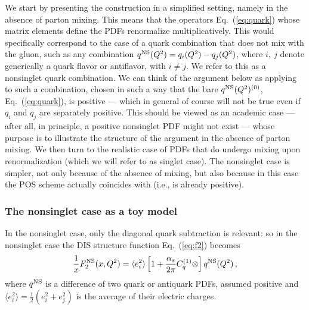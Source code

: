 We start by presenting the construction in a simplified setting, 
namely in the absence of parton mixing. This means that the operators
Eq.~(\ref{eq:quark}) whose matrix elements define the PDFs renormalize
multiplicatively.
This would specifically correspond to
the case of a quark combination that does not mix with the
gluon, such as  any combination $q^{{\textrm{NS}}}(Q^2)=q_i(Q^2)-q_j(Q^2)$,
where $i,\>j$ denote generically a quark flavor or antiflavor, with
$i\not= j$.  We refer to this as a 
nonsinglet quark combination. We can think of the argument below as
applying to such a combination, 
chosen in such a way that  the bare
$q^{{\textrm{NS}}}(Q^2)^{(0)}$, Eq.~(\ref{eq:quark}), is positive --- which in
general of course will not be true even if $q_i$ and $q_j$ are
separately positive. 
This should be viewed as an academic case --- after
all, in principle, a positive nonsinglet PDF might not exist --- whose
purpose is to illustrate the structure of the argument in the absence
of parton mixing. We then turn
to the realistic case of PDFs that do undergo mixing upon
renormalization (which we will refer to as singlet case).
The nonsinglet case is simpler, not only because of the absence of
mixing, but also because in  this case
the POS scheme actually coincides with \msbar{} (i.e., \msbar{} is already
positive). 

\subsubsection{The nonsinglet case as a toy model}
\label{sec:nonsing}

In the nonsinglet case, only the diagonal
quark subtraction is relevant: so in the nonsinglet case
the DIS structure function Eq.~(\ref{eq:f2}) becomes
\begin{equation}\label{eq:disfact}
 \frac{1}{x} F_2^{{\textrm{NS}}}(x,Q^2)= \langle e_i^2\rangle \left[1
 +\frac{\alpha_s}{2\pi}  C^{(1)}_q \otimes \right] q^{{\textrm{NS}}}(Q^2) \,,
\end{equation}
where $q^{{\textrm{NS}}}$ is a difference of two quark or antiquark PDFs, assumed
positive and
$\langle
e^2_i\rangle=\frac{1}{2} \left(e^2_i+e^2_j\right)$ is the average of
their electric charges. 

